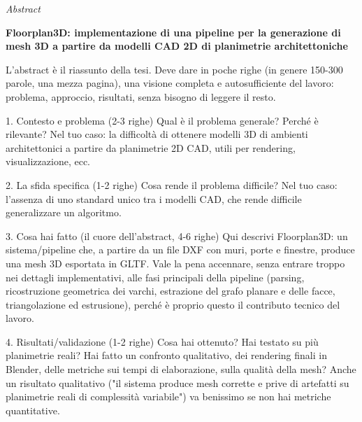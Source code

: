 \makeatletter
\newcommand{\beginitalianAbstract}{%
  \thispagestyle{plain}%
  \begin{center}
    \setlength{\parskip}{0pt}
    {\huge\textit{Abstract}\par}
    \bigskip
    {\normalsize\bf \ttitle \par}
    \bigskip
  \end{center}
}
\makeatother

\newcommand{\ttitle}{Floorplan3D:  implementazione di una pipeline per la generazione di mesh 3D a partire da modelli CAD 2D di planimetrie architettoniche}

\beginitalianAbstract
{}

L'abstract è il riassunto della tesi. Deve dare in poche righe (in genere 150-300 parole, una mezza pagina), una visione completa e autosufficiente del lavoro: problema, approccio, risultati, senza bisogno di leggere il resto.

1. Contesto e problema (2-3 righe)
Qual è il problema generale? Perché è rilevante? Nel tuo caso: la difficoltà di ottenere modelli 3D di ambienti architettonici a partire da planimetrie 2D CAD, utili per rendering, visualizzazione, ecc.

2. La sfida specifica (1-2 righe)
Cosa rende il problema difficile? Nel tuo caso: l'assenza di uno standard unico tra i modelli CAD, che rende difficile generalizzare un algoritmo.

3. Cosa hai fatto (il cuore dell'abstract, 4-6 righe)
Qui descrivi Floorplan3D: un sistema/pipeline che, a partire da un file DXF con muri, porte e finestre, produce una mesh 3D esportata in GLTF. Vale la pena accennare, senza entrare troppo nei dettagli implementativi, alle fasi principali della pipeline (parsing, ricostruzione geometrica dei varchi, estrazione del grafo planare e delle facce, triangolazione ed estrusione), perché è proprio questo il contributo tecnico del lavoro.

4. Risultati/validazione (1-2 righe)
Cosa hai ottenuto? Hai testato su più planimetrie reali? Hai fatto un confronto qualitativo, dei rendering finali in Blender, delle metriche sui tempi di elaborazione, sulla qualità della mesh? Anche un risultato qualitativo ("il sistema produce mesh corrette e prive di artefatti su planimetrie reali di complessità variabile") va benissimo se non hai metriche quantitative.


